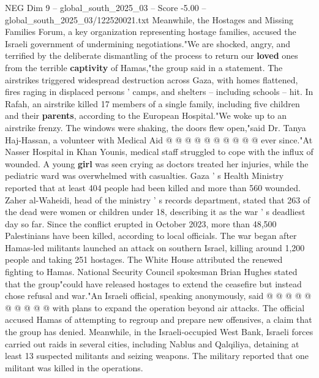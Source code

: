 \begin{textsample}{NEG Dim 9 – global\_south\_2025\_03 – Score -5.00 – global\_south\_2025\_03/122520021.txt}
Meanwhile, the Hostages and Missing Families Forum, a key organization representing hostage families, accused the Israeli government of undermining negotiations."We are shocked, angry, and terrified by the deliberate dismantling of the process to return our \textbf{loved} ones from the terrible \textbf{captivity} of Hamas,"the group said in a statement.
The airstrikes triggered widespread destruction across Gaza, with homes flattened, fires raging in displaced persons ' camps, and shelters -- including schools -- hit.
In Rafah, an airstrike killed 17 members of a single family, including five children and their \textbf{parents}, according to the European Hospital."We woke up to an airstrike frenzy.
The windows were shaking, the doors flew open,"said Dr.
Tanya Haj-Hassan, a volunteer with Medical Aid @ @ @ @ @ @ @ @ @ @ ever since."At Nasser Hospital in Khan Younis, medical staff struggled to cope with the influx of wounded.
A young \textbf{girl} was seen crying as doctors treated her injuries, while the pediatric ward was overwhelmed with casualties.
Gaza ' s Health Ministry reported that at least 404 people had been killed and more than 560 wounded.
Zaher al-Waheidi, head of the ministry ' s records department, stated that 263 of the dead were women or children under 18, describing it as the war ' s deadliest day so far.
Since the conflict erupted in October 2023, more than 48,500 Palestinians have been killed, according to local officials.
The war began after Hamas-led militants launched an attack on southern Israel, killing around 1,200 people and taking 251 hostages.
The White House attributed the renewed fighting to Hamas.
National Security Council spokesman Brian Hughes stated that the group"could have released hostages to extend the ceasefire but instead chose refusal and war."An Israeli official, speaking anonymously, said @ @ @ @ @ @ @ @ @ @ with plans to expand the operation beyond air attacks.
The official accused Hamas of attempting to regroup and prepare new offensives, a claim that the group has denied.
Meanwhile, in the Israeli-occupied West Bank, Israeli forces carried out raids in several cities, including Nablus and Qalqiliya, detaining at least 13 suspected militants and seizing weapons.
The military reported that one militant was killed in the operations.

\end{textsample}
